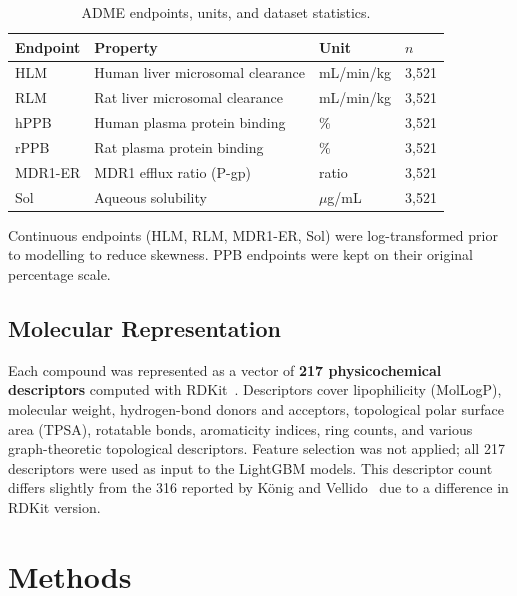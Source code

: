 \documentclass[a4paper, 11pt]{article}
\begin{document}
\begin{table}[H]
  \centering
  \caption{ADME endpoints, units, and dataset statistics.}
  \label{tab:endpoints}
  \begin{tabular}{llll}
    \toprule
    \textbf{Endpoint} & \textbf{Property} & \textbf{Unit} & \textbf{$n$} \\
    \midrule
    HLM      & Human liver microsomal clearance   & mL/min/kg & 3{,}521 \\
    RLM      & Rat liver microsomal clearance     & mL/min/kg & 3{,}521 \\
    hPPB     & Human plasma protein binding       & \%        & 3{,}521 \\
    rPPB     & Rat plasma protein binding         & \%        & 3{,}521 \\
    MDR1-ER  & MDR1 efflux ratio (P-gp)           & ratio     & 3{,}521 \\
    Sol      & Aqueous solubility                 & $\mu$g/mL & 3{,}521 \\
    \bottomrule
  \end{tabular}
\end{table}

Continuous endpoints (HLM, RLM, MDR1-ER, Sol) were log-transformed prior
to modelling to reduce skewness. PPB endpoints were kept on their original
percentage scale.

\subsection{Molecular Representation}

Each compound was represented as a vector of \textbf{217 physicochemical
descriptors} computed with RDKit~\cite{landrum2006rdkit}. Descriptors
cover lipophilicity (MolLogP), molecular weight, hydrogen-bond donors and
acceptors, topological polar surface area (TPSA), rotatable bonds,
aromaticity indices, ring counts, and various graph-theoretic topological
descriptors. Feature selection was not applied; all 217 descriptors were
used as input to the LightGBM models. This descriptor count differs
slightly from the 316 reported by König and Vellido~\cite{konig2024adme}
due to a difference in RDKit version.


\section{Methods}
\label{sec:methods}
\end{document}
